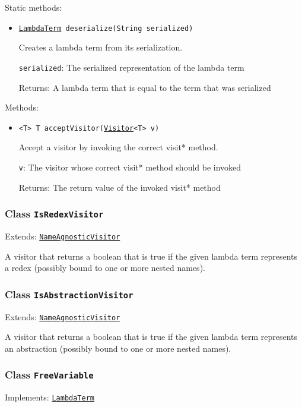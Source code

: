 Static methods:
\begin{itemize}
\item \texttt{\hyperref[type:edu.kit.wavelength.client.model.term.LambdaTerm]{LambdaTerm} deserialize(String serialized)}

Creates a lambda term from its serialization.

\texttt{serialized}: The serialized representation of the lambda term

Returns: A lambda term that is equal to the term that was serialized

\end{itemize}

Methods:
\begin{itemize}
\item \texttt{<T> T acceptVisitor(\hyperref[type:edu.kit.wavelength.client.model.term.Visitor]{Visitor}<T> v)}

Accept a visitor by invoking the correct visit* method.

\texttt{v}: The visitor whose correct visit* method should be invoked

Returns: The return value of the invoked visit* method

\end{itemize}

\subsubsection{Class \texttt{IsRedexVisitor}}
\label{type:edu.kit.wavelength.client.model.term.IsRedexVisitor}
Extends: \texttt{\hyperref[type:edu.kit.wavelength.client.model.term.NameAgnosticVisitor]{NameAgnosticVisitor}}

A visitor that returns a boolean that is true if the given
 lambda term represents a redex (possibly bound to one
 or more nested names).

\subsubsection{Class \texttt{IsAbstractionVisitor}}
\label{type:edu.kit.wavelength.client.model.term.IsAbstractionVisitor}
Extends: \texttt{\hyperref[type:edu.kit.wavelength.client.model.term.NameAgnosticVisitor]{NameAgnosticVisitor}}

A visitor that returns a boolean that is true if the given
 lambda term represents an abstraction (possibly bound to one
 or more nested names).

\subsubsection{Class \texttt{FreeVariable}}
\label{type:edu.kit.wavelength.client.model.term.FreeVariable}
Implements: \texttt{\hyperref[type:edu.kit.wavelength.client.model.term.LambdaTerm]{LambdaTerm}}

